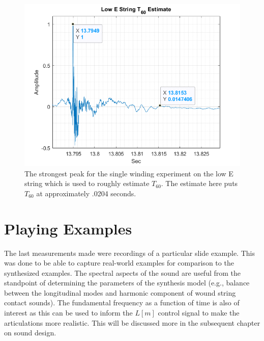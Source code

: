 \documentclass[../main.tex]{subfiles}
\begin{document}
\begin{figure}[h!]
    \centering
    \includegraphics[scale=.65]{./images/plots/T60Attempt.png}
    \caption{The strongest peak for the single winding experiment on the low E string which is used to roughly estimate $T_{60}$. The estimate here puts $T_{60}$ at approximately .0204 seconds.}
    \label{fig:T60Measurement}
\end{figure}

\clearpage

\section{Playing Examples}
 The last measurements made were recordings of a particular slide example. This was done to be able to capture real-world examples for comparison to the synthesized examples. The spectral aspects of the sound are useful from the standpoint of determining the parameters of the synthesis model (e.g., balance between the longitudinal modes and harmonic component of wound string contact sounds). The fundamental frequency as a function of time is also of interest as this can be used to inform the $L[m]$ control signal to make the articulations more realistic. This will be discussed more in the subsequent chapter on sound design.
\end{document}
